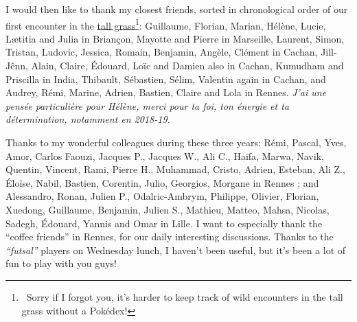 \begin{acknowledgements}
I would then like to thank my closest friends, sorted in chronological order of our first encounter in the \href{https://bulbapedia.bulbagarden.net/wiki/Tall_grass}{tall grass}\footnote{~Sorry if I forgot you, it's harder to keep track of wild encounters in the tall grass without a Pokédex!}: Guillaume, Florian, Marian, Hélène, Lucie, Lætitia and Julia in Briançon, Mayotte and Pierre in Marseille, Laurent, Simon, Tristan, Ludovic, Jessica, Romain, Benjamin, Angèle, Clément in Cachan, Jill-Jênn, Alain, Claire, Édouard, Loïc and Damien also in Cachan, Kumudham and Priscilla in India, Thibault, Sébastien, Sélim, Valentin again in Cachan, and Audrey, Rémi, Marine, Adrien, Bastien, Claire  and Lola in Rennes.
\emph{J'ai une pensée particulière pour Hélène, merci pour ta foi, ton énergie et ta détermination, notamment en 2018-19.}

Thanks to my wonderful colleagues during these three years: Rémi\textsuperscript{\tiny{\Coffeecup}}, Pascal\textsuperscript{\tiny{\Coffeecup}}, Yves, Amor, Carlos Faouzi, Jacques P., Jacques W., Ali C., Haïfa, Marwa, Navik, Quentin\textsuperscript{\tiny{\Coffeecup}}, Vincent\textsuperscript{\tiny{\Coffeecup}}, Rami\textsuperscript{\tiny{\Coffeecup}}, Pierre H., Muhammad, Cristo\textsuperscript{\tiny{\Coffeecup}}, Adrien\textsuperscript{\tiny{\Coffeecup}}, Esteban\textsuperscript{\tiny{\Coffeecup}}, Ali Z., Éloïse\textsuperscript{\tiny{\Coffeecup}}, Nabil\textsuperscript{\tiny{\Coffeecup}}, Bastien\textsuperscript{\tiny{\Coffeecup}}, Corentin\textsuperscript{\tiny{\Coffeecup}}, Julio, Georgios, Morgane\textsuperscript{\tiny{\Coffeecup}} in Rennes ; and Alessandro, Ronan, Julien P., Odalric-Ambrym, Philippe, Olivier, Florian, Xuedong, Guillaume, Benjamin, Julien S., Mathieu, Matteo, Mahsa, Nicolas, Sadegh, Édouard, Yannis and Omar in Lille.
I want to especially thank the ``coffee friends\textsuperscript{\tiny{\Coffeecup}}'' in Rennes, for our daily interesting discussions.
%
Thanks to the \emph{``futsal''} players on Wednesday lunch,
I haven't been useful, but it's been a lot of fun to play with you guys!



\end{acknowledgements}
